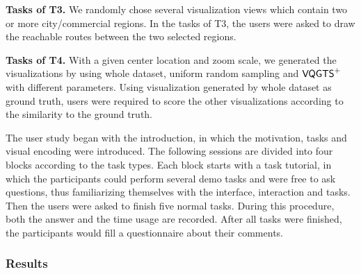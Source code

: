 \textbf{Tasks of T3.} We randomly chose several visualization views which contain two or more city/commercial regions. In the tasks of T3, the users were asked to draw the reachable routes between the two selected regions.

\textbf{Tasks of T4.} With a given center location and zoom scale, we generated the visualizations by using whole dataset, uniform random sampling and $\mathsf{VQGTS}^{+}$ with different parameters. Using visualization generated by whole dataset as ground truth, users were required to score the other visualizations according to the similarity to the ground truth.

The user study began with the introduction, in which the motivation, tasks and visual encoding were introduced. The following sessions are divided into four blocks according to the task types. Each block starts with a task tutorial, in which the participants could perform several demo tasks and were free to ask questions, thus familiarizing themselves with the interface, interaction and tasks.
Then the users were asked to finish five normal tasks. During this procedure, both the answer and the time usage are recorded.
After all tasks were finished, the participants would fill a questionnaire about their comments.

\subsubsection{Results}



